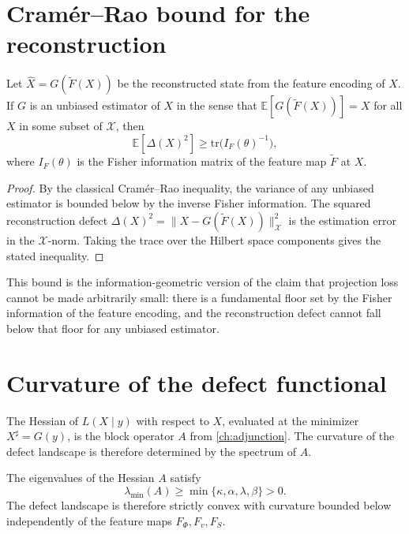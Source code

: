 \documentclass[12pt, oneside]{memoir}
\newcommand{\X}{\mathcal{X}}
\newcommand{\Ft}{\widetilde{F}}
\newcommand{\nnorm}[1]{\lVert #1 \rVert}
\begin{document}
\section{Cramér--Rao bound for the reconstruction}

\begin{proposition}
\label{prop:CR}
Let $\hat X = G(\Ft(X))$ be the reconstructed state from the feature encoding of $X$.
If $G$ is an unbiased estimator of $X$ in the sense that $\mathbb{E}[G(\Ft(X))] = X$
for all $X$ in some subset of $\X$, then
\begin{equation}
  \mathbb{E}[\Delta(X)^2] \ge \mathrm{tr}\bigl(I_F(\theta)^{-1}\bigr),
\end{equation}
where $I_F(\theta)$ is the Fisher information matrix of the feature map $\Ft$ at $X$.
\end{proposition}

\begin{proof}
By the classical Cramér--Rao inequality, the variance of any unbiased estimator is
bounded below by the inverse Fisher information.  The squared reconstruction defect
$\Delta(X)^2 = \nnorm{X - G(\Ft(X))}_\X^2$ is the estimation error in the $\X$-norm.
Taking the trace over the Hilbert space components gives the stated inequality.
\end{proof}

This bound is the information-geometric version of the claim that projection loss cannot
be made arbitrarily small: there is a fundamental floor set by the Fisher information of
the feature encoding, and the reconstruction defect cannot fall below that floor for any
unbiased estimator.

\section{Curvature of the defect functional}

The Hessian of $L(X \mid y)$ with respect to $X$, evaluated at the minimizer
$X^\sharp = G(y)$, is the block operator $A$ from \cref{ch:adjunction}.  The curvature
of the defect landscape is therefore determined by the spectrum of $A$.

\begin{proposition}
\label{prop:spectrum}
The eigenvalues of the Hessian $A$ satisfy
\begin{equation}
  \lambda_{\min}(A) \ge \min\{\kappa, \alpha, \lambda, \beta\} > 0.
\end{equation}
The defect landscape is therefore strictly convex with curvature bounded below
independently of the feature maps $F_\Phi, F_v, F_S$.
\end{proposition}
\end{document}

